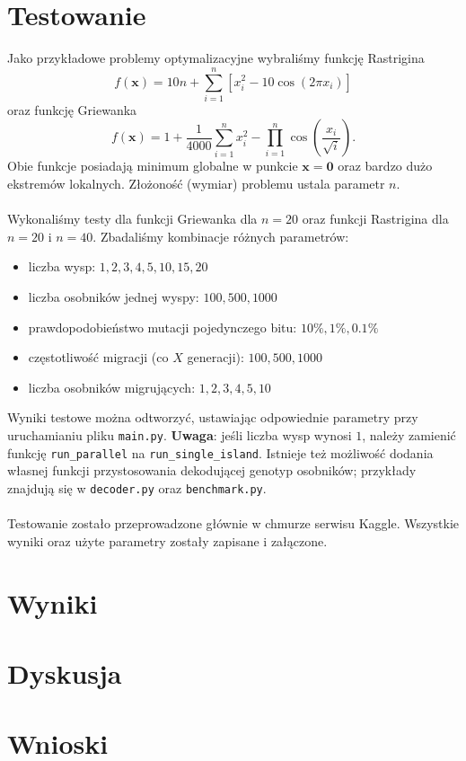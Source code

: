 \documentclass[12pt,a4paper]{article}
\begin{document}
\section*{Testowanie}
Jako przykładowe problemy optymalizacyjne wybraliśmy funkcję Rastrigina
\[ f(\mathbf{x})=10n+\sum_{i=1}^{n}\left[x_i^2-10\cos(2\pi x_i)\right] \]
oraz funkcję Griewanka
\[ f(\mathbf{x})=1+\frac{1}{4000}\sum_{i=1}^{n}x_i^2-\prod_{i=1}^{n}\cos\left(\frac{x_i}{\sqrt{i}}\right). \] Obie funkcje posiadają minimum globalne w punkcie $\mathbf{x=0}$ oraz bardzo dużo ekstremów lokalnych. Złożoność (wymiar) problemu ustala parametr $n$.
\\
\\
Wykonaliśmy testy dla funkcji Griewanka dla $n=20$ oraz funkcji Rastrigina dla $n=20$ i $n=40$. Zbadaliśmy kombinacje różnych parametrów:
\begin{itemize}
	\item liczba wysp: $1,2,3,4,5,10,15,20$
	\item liczba osobników jednej wyspy: $100,500,1000$
	\item prawdopodobieństwo mutacji pojedynczego bitu: $10\%,1\%,0.1\%$
	\item częstotliwość migracji (co $X$ generacji): $100,500,1000$
	\item liczba osobników migrujących: $1,2,3,4,5,10$
\end{itemize}
Wyniki testowe można odtworzyć, ustawiając odpowiednie parametry przy uruchamianiu pliku \texttt{main.py}. \textbf{Uwaga}: jeśli liczba wysp wynosi $1$, należy zamienić funkcję \texttt{run\_parallel} na \texttt{run\_single\_island}. Istnieje też możliwość dodania własnej funkcji przystosowania dekodującej genotyp osobników; przykłady znajdują się w \texttt{decoder.py} oraz \texttt{benchmark.py}.
\\
\\
Testowanie zostało przeprowadzone głównie w chmurze serwisu Kaggle. Wszystkie wyniki oraz użyte parametry zostały zapisane i załączone.

\section*{Wyniki}

\section*{Dyskusja}

\section*{Wnioski}

\nocite{*}

{}
\end{document}
